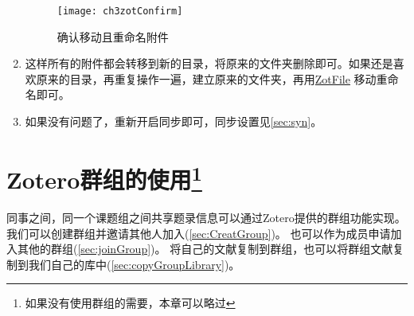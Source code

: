 \documentclass[cn,11pt,chinese]{elegantbook}
\begin{document}
\begin{enumerate}
		\begin{figure}[htbp]
			\centering
			\texttt{[image: ch3zotConfirm]}
			\caption{确认移动且重命名附件}
			\label{fig:ch3zotConfirm}
		\end{figure}
\item 这样所有的附件都会转移到新的目录，将原来的文件夹删除即可。如果还是喜欢原来的目录，再重复操作一遍，建立原来的文件夹，再用\href{http://zotfile.com/}{ZotFile}
移动重命名即可。	
\item 如果没有问题了，重新开启同步即可，同步设置见\cref{sec:syn}。	
\end{enumerate}


\chapter[Zotero群组的使用]{Zotero群组的使用\footnote{如果没有使用群组的需要，本章可以略过}}\label{ch:group}
	同事之间，同一个课题组之间共享题录信息可以通过Zotero提供的群组功能实现。
	我们可以创建群组并邀请其他人加入(\cref{sec:CreatGroup})。
	也可以作为成员申请加入其他的群组(\cref{sec:joinGroup})。
	将自己的文献复制到群组，也可以将群组文献复制到我们自己的库中(\cref{sec:copyGroupLibrary})。


   
\end{document}
